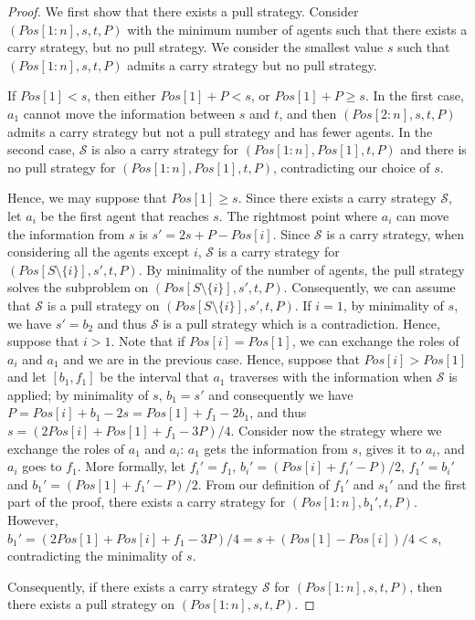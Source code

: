 \documentclass{article}
\newcommand\subproblem{carry\xspace}
\newcommand\cS{\ensuremath{\mathcal{S}\xspace}}
\begin{document}
\begin{proof}
We first show that there exists a pull strategy. 
Consider $(Pos[1:n],s,t,P)$ with the minimum number of
agents such that there exists a \subproblem strategy, but no
pull strategy. We consider the smallest value $s$ such that $(Pos[1:n],s,t,P)$
admits a \subproblem strategy but no pull strategy.

If $Pos[1] < s$, then either $Pos[1]+P < s$, or $Pos[1]+P \geq s$. In the
first case, $a_1$ cannot move the information between $s$ and $t$, and
then $(Pos[2:n],s,t,P)$ admits a carry strategy but not a pull strategy and has fewer agents. In the
second case, $\cS$ is also a \subproblem strategy for $(Pos[1:n],Pos[1],t,P)$ and there is no pull strategy for $(Pos[1:n],Pos[1],t,P)$,
contradicting our choice of $s$.

Hence, we may suppose that $Pos[1]\geq s$. Since there exists a carry strategy $\cS$, let $a_i$ be the first agent that
reaches $s$.  The rightmost point where $a_i$ can move the information
from $s$ is $s'= 2s+P-Pos[i]$. Since $\cS$ is a \subproblem strategy,
when considering all the agents except $i$, $\cS$ is a \subproblem
strategy for $(Pos[S\setminus\{i\}],s',t,P)$. By minimality of the
number of agents, the pull strategy solves the subproblem on
$(Pos[S\setminus\{i\}],s',t,P)$.  Consequently, we can assume that
$\cS$ is a pull strategy on $(Pos[S\setminus\{i\}],s',t,P)$.  If $i =
1$, by minimality of $s$, we have $s' = b_2$ and thus $\cS$ is a pull
strategy which is a contradiction. Hence, suppose that $i>1$. Note that if $Pos[i]=Pos[1]$, we can exchange the roles of
$a_i$ and $a_1$ and we are in the previous case.
Hence, suppose that $Pos[i] > Pos[1]$ and let $[b_1,f_1]$ be the interval
that $a_1$ traverses with the information when $\cS$ is applied; by
minimality of $s$, $b_1 = s'$ and consequently we have $P = Pos[i] +
b_1 - 2s = Pos[1]+f_1-2b_1$, and thus $s = (2Pos[i]+Pos[1]+f_1-3P)/4$.
Consider now the strategy where we exchange the roles of $a_1$ and
$a_i$: $a_1$ gets the information from $s$, gives it to $a_i$, and
$a_i$ goes to $f_1$. More formally, let $f_i' = f_1$, $b_i' = (Pos[i]
+ f_i' - P)/2$, $f_1' = b_i'$ and $b_1' = (Pos[1] + f_1' - P)/2$. From
our definition of $f_1'$ and $s_1'$ and the first part of the proof,
there exists a \subproblem strategy for
$(Pos[1:n],b_1',t,P)$. However, $b_1' = (2Pos[1]+Pos[i]+f_1-3P)/4 = s
+ (Pos[1] - Pos[i])/4 < s$, contradicting the minimality of $s$.

Consequently, if there exists a carry strategy $\cS$ for $(Pos[1:n],s,t,P)$, then there exists
a pull strategy on
$(Pos[1:n],s,t,P)$. 


\end{proof}
\end{document}
